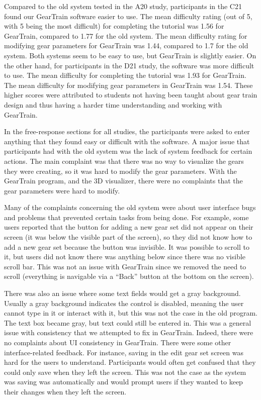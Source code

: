 \begin{doublespace}
Compared to the old system tested in the A20 study, participants in the C21 found our GearTrain software easier to use. The mean difficulty rating (out of 5, with 5 being the most difficult) for completing the tutorial was 1.56 for GearTrain, compared to 1.77 for the old system. The mean difficulty rating for modifying gear parameters for GearTrain was 1.44, compared to 1.7 for the old system. Both systems seem to be easy to use, but GearTrain is slightly easier. On the other hand, for participants in the D21 study, the software was more difficult to use. The mean difficulty for completing the tutorial was 1.93 for GearTrain. The mean difficulty for modifying gear parameters in GearTrain was 1.54. These higher scores were attributed to students not having been taught about gear train design and thus having a harder time understanding and working with GearTrain.

In the free-response sections for all studies, the participants were asked to enter anything that they found easy or difficult with the software. A major issue that participants had with the old system was the lack of system feedback for certain actions. The main complaint was that there was no way to visualize the gears they were creating, so it was hard to modify the gear parameters. With the GearTrain program, and the 3D visualizer, there were no complaints that the gear parameters were hard to modify.

Many of the complaints concerning the old system were about user interface bugs and problems that prevented certain tasks from being done. For example, some users reported that the button for adding a new gear set did not appear on their screen (it was below the visible part of the screen), so they did not know how to add a new gear set because the button was invisible. It was possible to scroll to it, but users did not know there was anything below since there was no visible scroll bar. This was not an issue with GearTrain since we removed the need to scroll (everything is navigable via a ``Back'' button at the bottom on the screen).

There was also an issue where some text fields would get a gray background. Usually a gray background indicates the control is disabled, meaning the user cannot type in it or interact with it, but this was not the case in the old program. The text box became gray, but text could still be entered in. This was a general issue with consistency that we attempted to fix in GearTrain. Indeed, there were no complaints about UI consistency in GearTrain. There were some other interface-related feedback. For instance, saving in the edit gear set screen was hard for the users to understand. Participants would often get confused that they could only save when they left the screen. This was not the case as the system was saving was automatically and would prompt users if they wanted to keep their changes when they left the screen.


\end{doublespace}
